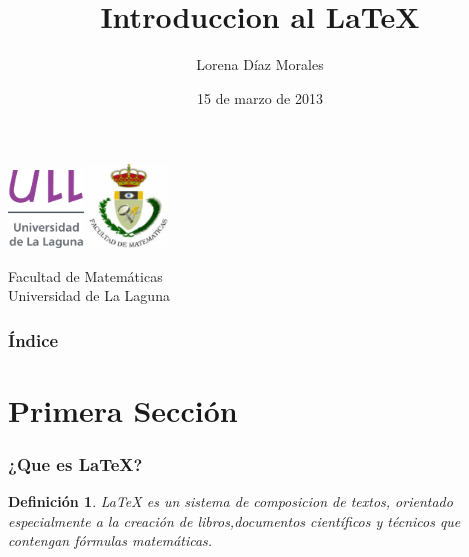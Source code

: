 \documentclass{beamer}
\title[Presentación con Beamer]{Introduccion al \LaTeX{} }
\author[L. Diaz]{Lorena Díaz Morales}
\date[15-03-2013]{15 de marzo de 2013}
\newtheorem{definicion}{Definición}
\begin{document}
  
\begin{frame}

  \includegraphics[width=0.15\textwidth]{img/ullesc.eps}
  \hspace*{7.5cm}
  \includegraphics[width=0.16\textwidth]{img/fmatesc.eps}
  \titlepage

  \begin{scriptsize}
    \begin{center}
     Facultad de Matemáticas \\
     Universidad de La Laguna
    \end{center}
  \end{scriptsize}

\end{frame}

\begin{frame}
  \frametitle{Índice}  
  \tableofcontents[pausesections]
\end{frame}


\section{Primera Sección}

\begin{frame}

\frametitle{¿Que es \LaTeX{}?}

\begin{definicion}
\LaTeX{} es un sistema de composicion de textos, orientado especialmente a la creación de libros,documentos científicos y técnicos que 
contengan fórmulas matemáticas.

\end{definicion}

\end{frame}
\end{document}
